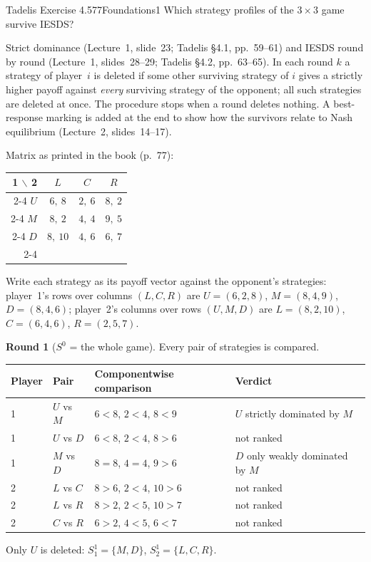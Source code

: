 \begin{exsol}{Tadelis Exercise 4.5}{77}{Foundations}{1}
\asked Which strategy profiles of the $3\times3$ game survive IESDS?

\method Strict dominance (Lecture~1, slide~23; Tadelis \S4.1, pp.~59--61) and IESDS round by round
(Lecture~1, slides~28--29; Tadelis \S4.2, pp.~63--65). In each round $k$ a strategy of player~$i$ is
deleted if some other surviving strategy of $i$ gives a strictly higher payoff against
\emph{every} surviving strategy of the opponent; all such strategies are deleted at once. The
procedure stops when a round deletes nothing. A best-response marking is added at the end to
show how the survivors relate to Nash equilibrium (Lecture~2, slides~14--17).

\solution
Matrix as printed in the book (p.~77):
\begin{center}
\begin{tabular}{r|c|c|c|}
\multicolumn{1}{r}{1 $\backslash$ 2} & \multicolumn{1}{c}{$L$} & \multicolumn{1}{c}{$C$} & \multicolumn{1}{c}{$R$}\\ \cline{2-4}
$U$ & $6,\ 8$ & $2,\ 6$ & $8,\ 2$ \\ \cline{2-4}
$M$ & $8,\ 2$ & $4,\ 4$ & $9,\ 5$ \\ \cline{2-4}
$D$ & $8,\ 10$ & $4,\ 6$ & $6,\ 7$ \\ \cline{2-4}
\end{tabular}
\end{center}
Write each strategy as its payoff vector against the opponent's strategies: player~1's rows over
columns $(L,C,R)$ are $U = (6,2,8)$, $M = (8,4,9)$, $D = (8,4,6)$; player~2's columns over rows
$(U,M,D)$ are $L = (8,2,10)$, $C = (6,4,6)$, $R = (2,5,7)$.

\textbf{Round 1} ($S^0$ = the whole game). Every pair of strategies is compared.
\begin{center}\small
\begin{tabular}{llll}
\toprule
Player & Pair & Componentwise comparison & Verdict \\
\midrule
1 & $U$ vs $M$ & $6<8$, $2<4$, $8<9$ & $U$ strictly dominated by $M$ \\
1 & $U$ vs $D$ & $6<8$, $2<4$, $8>6$ & not ranked \\
1 & $M$ vs $D$ & $8=8$, $4=4$, $9>6$ & $D$ only weakly dominated by $M$ \\
2 & $L$ vs $C$ & $8>6$, $2<4$, $10>6$ & not ranked \\
2 & $L$ vs $R$ & $8>2$, $2<5$, $10>7$ & not ranked \\
2 & $C$ vs $R$ & $6>2$, $4<5$, $6<7$ & not ranked \\
\bottomrule
\end{tabular}
\end{center}
Only $U$ is deleted: $S_1^1 = \{M, D\}$, $S_2^1 = \{L, C, R\}$.


\end{exsol}
